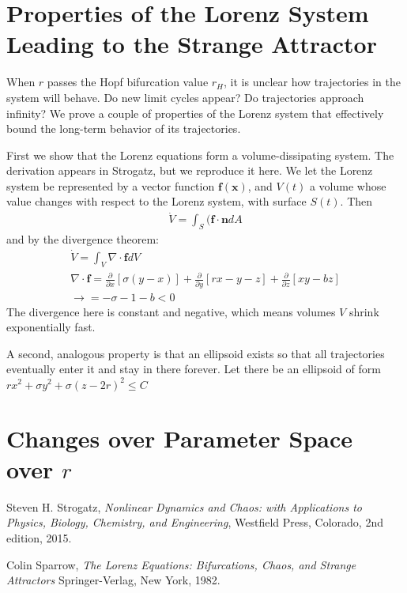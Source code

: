 \documentclass{report}
\begin{document}
\section{Properties of the Lorenz System Leading to the Strange Attractor}

When \(r\) passes the Hopf bifurcation value \(r_H\), it is unclear how
trajectories in the system will behave. Do new limit cycles appear? Do
trajectories approach infinity? We prove a couple of properties of the Lorenz
system that effectively bound the long-term behavior of its trajectories.

First we show that the Lorenz equations form a volume-dissipating system. The
derivation appears in Strogatz\cite{strogatz15}, but we reproduce it here.
We let the Lorenz system be represented by a vector function
\(\boldsymbol{f}(\boldsymbol{x})\), and \(V(t)\) a volume whose value changes
with respect to the Lorenz system, with surface \(S(t)\). Then
\begin{align*}
  \dot{V} = \int_S (\boldsymbol{f}\cdot\boldsymbol{n}dA
\end{align*}
and by the divergence theorem:
\begin{align*}
  \dot{V} = \int_V \nabla\cdot\boldsymbol{f}dV \\
  \nabla\cdot\boldsymbol{f} = \frac{\partial}{\partial x}[\sigma(y-x)]
+\frac{\partial}{\partial y}[rx-y-z] + \frac{\partial}{\partial z}[xy-bz] \\
  \rightarrow = -\sigma -1-b < 0 
\end{align*}
The divergence here is constant and negative, which means volumes \(V\) shrink
exponentially fast.

A second, analogous property is that an ellipsoid exists so that all
trajectories eventually enter it and stay in there forever. Let there be an
ellipsoid of form \(rx^2 +\sigma y^2+\sigma(z-2r)^2 \leq C\)
\section{Changes over Parameter Space over \(r\)}



\begin{thebibliography}{9}

  Steven H. Strogatz,
  \emph{Nonlinear Dynamics and Chaos: with Applications to Physics, Biology,
Chemistry, and Engineering},
  Westfield Press, Colorado,
  2nd edition,
  2015.

  Colin Sparrow,
  \emph{The Lorenz Equations: Bifurcations, Chaos, and Strange Attractors}
  Springer-Verlag, New York,
  1982.
\end{thebibliography}
\end{document}
